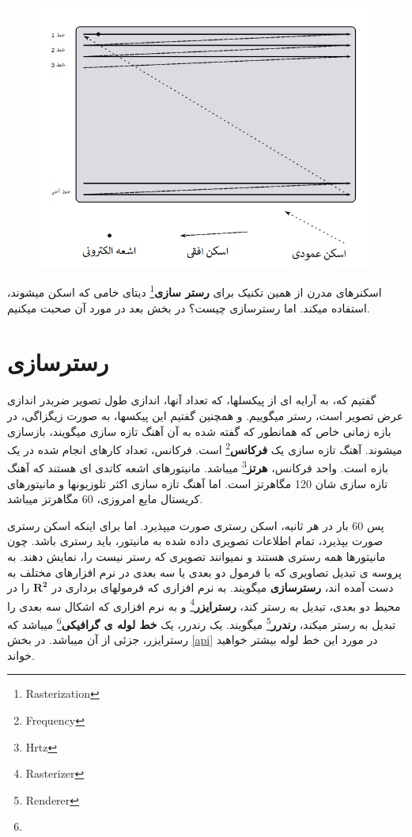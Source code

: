 \documentclass[14pt,a4paper]{memoir}
\begin{document}
 
	 \begin{figure}[H]
	 	\centering
	 	\includegraphics[scale=0.6]{RasterScan}
	 \end{figure}
	 
	 
	 اسکنرهای مدرن از همین تکنیک برای \textbf{رستر سازی}\footnote{Rasterization} دیتای خامی که اسکن میشوند، استفاده میکند. اما رسترسازی چیست؟ در بخش بعد در مورد آن صحبت میکنیم.
	 
	 \section{رسترسازی}\label{rasterize}
	 
	 
	 گفتیم که، به آرایه ای از پیکسلها، که تعداد آنها، اندازی طول تصویر ضربدر اندازی عرض تصویر است، رستر میگوییم. و همچنین گفتیم این پیکسها، به صورت زیگزاگی، در بازه زمانی خاص که همانطور که گفته شده به آن آهنگ تازه سازی میگویند، بازسازی میشوند. آهنگ تازه سازی یک \textbf{فرکانس}\footnote{Frequency} است. فرکانس، تعداد کارهای انجام شده در یک بازه است. واحد فرکانس، \textbf{هرتز}\footnote{Hrtz} میباشد. مانیتورهای اشعه کاتدی ای هستند که آهنگ تازه سازی شان 120 مگاهرتز است. اما آهنگ تازه سازی اکثر تلوزیونها و مانیتورهای کریستال مایع امروزی، 60 مگاهرتز میباشد.
	 
	 پس 60 بار در هر ثانیه، اسکن رستری صورت میپذیرد. اما برای اینکه اسکن رستری صورت بپذیرد، تمام اطلاعات تصویری داده شده به مانیتور، باید رستری باشد. چون مانیتورها همه رستری هستند و نمیوانند تصویری که رستر نیست را، نمایش دهند. به پروسه ی تبدیل تصاویری که با فرمول دو بعدی یا سه بعدی در نرم افزارهای مختلف به دست آمده اند، \textbf{رسترسازی} میگویند. به نرم افزاری که فرمولهای برداری در $ \mathbf{R^2} $ را در محیط دو بعدی، تبدیل به رستر کند، \textbf{رسترایزر}\footnote{Rasterizer} و به نرم افزاری که اشکال سه بعدی را تبدیل به رستر میکند، \textbf{رندرر}\footnote{Renderer} میگویند. یک رندرر، یک \textbf{خط لوله ی گرافیکی}\footnote{} میباشد که رسترایزر، جزئی از آن میباشد. در بخش \ref{api} در مورد این خط لوله بیشتر خواهید خواند.
	 
\end{document}
